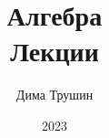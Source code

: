 \documentclass{article}
\begin{document}
\title{Алгебра\\Лекции}
\author{Дима Трушин}
\date{2023}
	
\maketitle
\tableofcontents


\end{document}
